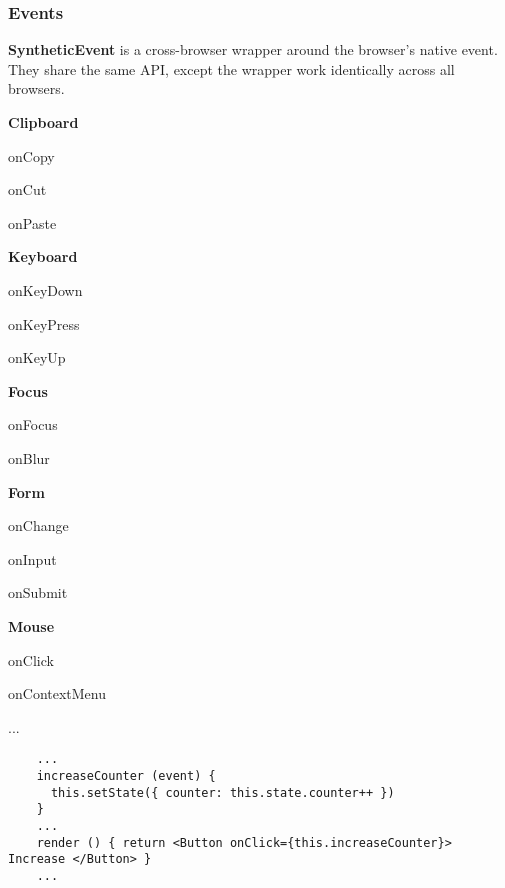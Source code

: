\begin{frame}[fragile]

  \frametitle{Events}

  \textbf{SyntheticEvent} is a cross-browser wrapper around the browser's native event. They share the same API, except the wrapper work identically across all browsers.

  \begin{footnotesize}
  \begin{multicols}{5}

    \textbf{Clipboard}

    onCopy

    onCut

    onPaste

    \columnbreak

    \textbf{Keyboard}

    onKeyDown

    onKeyPress

    onKeyUp

    \columnbreak

    \textbf{Focus}

    onFocus

    onBlur

    \columnbreak

    \textbf{Form}

    onChange

    onInput

    onSubmit

    \columnbreak

    \textbf{Mouse}

    onClick

    onContextMenu

    ...

  \end{multicols}
  \end{footnotesize}
  \begin{verbatim}
    ...
    increaseCounter (event) {
      this.setState({ counter: this.state.counter++ })
    }
    ...
    render () { return <Button onClick={this.increaseCounter}> Increase </Button> }
    ...
  \end{verbatim}
\end{frame}

